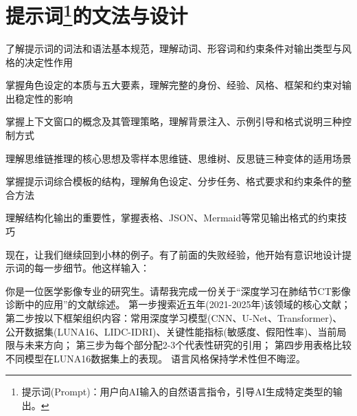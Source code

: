 \begin{center}
\textcolor{gray!70}{\*\ \ \*\ \ \*}
\end{center}
\vspace{12pt}

\newpage
\section[提示词的文法与设计]{\textbf{提示词}\footnote{提示词(Prompt)：用户向AI输入的自然语言指令，引导AI生成特定类型的输出。}的文法与设计}

\begin{sectionkeypoints}
\item 了解提示词的词法和语法基本规范，理解动词、形容词和约束条件对输出类型与风格的决定性作用
\item 掌握角色设定的本质与五大要素，理解完整的身份、经验、风格、框架和约束对输出稳定性的影响
\item 掌握上下文窗口的概念及其管理策略，理解背景注入、示例引导和格式说明三种控制方式
\item 理解思维链推理的核心思想及零样本思维链、思维树、反思链三种变体的适用场景
\item 掌握提示词综合模板的结构，理解角色设定、分步任务、格式要求和约束条件的整合方法
\item 理解结构化输出的重要性，掌握表格、JSON、Mermaid等常见输出格式的约束技巧
\end{sectionkeypoints}



现在，让我们继续回到小林的例子。有了前面的失败经验，他开始有意识地设计提示词的每一步细节。他这样输入：

\begin{userbox}
你是一位医学影像专业的研究生。请帮我完成一份关于“深度学习在肺结节CT影像诊断中的应用”的文献综述。
第一步搜索近五年(2021-2025年)该领域的核心文献；
第二步按以下框架组织内容：常用深度学习模型(CNN、U-Net、Transformer)、公开数据集(LUNA16、LIDC-IDRI)、关键性能指标(敏感度、假阳性率)、当前局限与未来方向；
第三步为每个部分配2-3个代表性研究的引用；
第四步用表格比较不同模型在LUNA16数据集上的表现。
语言风格保持学术性但不晦涩。
\end{userbox}

